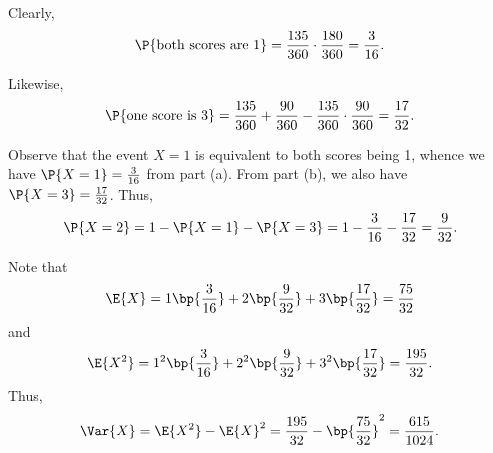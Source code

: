 \begin{solution}
    \begin{ppart}
        Clearly, \[\P{\text{both scores are 1}} = \frac{135}{360} \cdot \frac{180}{360} = \frac3{16}.\]
    \end{ppart}
    \begin{ppart}
        Likewise, \[\P{\text{one score is 3}} = \frac{135}{360} + \frac{90}{360} - \frac{135}{360} \cdot \frac{90}{360} = \frac{17}{32}.\]
    \end{ppart}

    Observe that the event $X = 1$ is equivalent to both scores being 1, whence we have $\P{X = 1} = \frac3{16}$ from part (a). From part (b), we also have $\P{X = 3} = \frac{17}{32}$. Thus, \[\P{X = 2} = 1 - \P{X = 1} - \P{X = 3} = 1 - \frac3{16} - \frac{17}{32} = \frac{9}{32}.\]

    Note that \[\E{X} = 1\bp{\frac3{16}} + 2\bp{\frac9{32}} + 3\bp{\frac{17}{32}} = \frac{75}{32}\] and \[\E{X^2} = 1^2\bp{\frac3{16}} + 2^2\bp{\frac9{32}} + 3^2\bp{\frac{17}{32}} = \frac{195}{32}.\] Thus, \[\Var{X} = \E{X^2} - \E{X}^2 = \frac{195}{32} - \bp{\frac{75}{32}}^2 = \frac{615}{1024}.\]
\end{solution}


